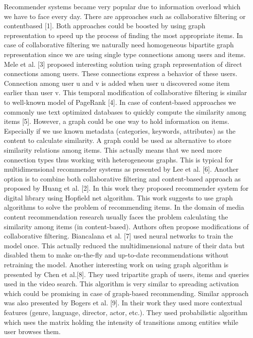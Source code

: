 \documentclass[10pt,slovak,a4paper]{article}
\begin{document}
\begin{multicols}{2}
\begin{small}
\end{small}

Recommender systems became very popular due to information overload which we have to face every day. There are approaches such as collaborative filtering or contentbased [1]. Both approaches could be boosted by using graph representation to speed up the process of finding the most appropriate items.
In case of collaborative filtering we naturally need homogeneous bipartite graph representation since we are using single type connections among users and items. Mele et al. [3] proposed interesting solution using graph representation of direct connections among users. These connections express a behavior of these users. Connection among user u and v is added when user u discovered some item earlier than user v. This temporal modification of collaborative filtering is similar to well-known model of PageRank [4].
In case of content-based approaches we commonly use text optimized databases to quickly compute the similarity among items [5]. However, a graph could be one way to hold information on items. Especially if we use known metadata (categories, keywords, attributes) as the content to calculate similarity. A graph could be used as alternative to store similarity relations among items. This actually means that we need more connection types thus working with heterogeneous graphs. This is typical for multidimensional recommender systems as presented by Lee et al. [6].
Another option is to combine both collaborative filtering and content-based approach as proposed by Huang et al. [2]. In this work they proposed recommender system for digital library using Hopfield net algorithm. This work suggests to use graph algorithms to solve the problem of recommending items.
In the domain of media content recommendation research usually faces the problem calculating the similarity among items (in content-based). Authors often propose modifications of collaborative filtering. Biancalana et al. [7] used neural networks to train the model once. This actually reduced the multidimensional nature of their data but disabled them to make on-the-fly and up-to-date recommendations without retraining the model.
Another interesting work on using graph algorithm is presented by Chen et al.[8]. They used tripartite graph of users, items and queries used in the video search. This algorithm is very similar to spreading activation which could be promising in case of graph-based recommending. Similar approach was also presented by Bogers et al. [9]. In their work they used more contextual features (genre, language, director, actor, etc.). They used probabilistic algorithm which uses the matrix holding the intensity of transitions among entities while user browses them.



\end{multicols}
\end{document}
